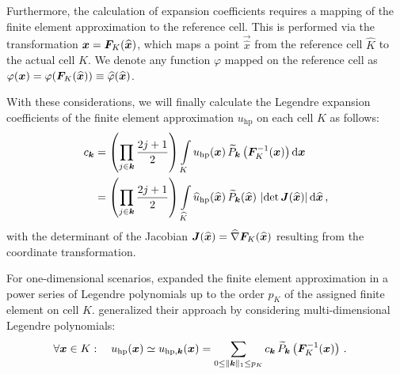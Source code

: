 Furthermore, the calculation of expansion coefficients requires a mapping of the finite element approximation to the reference cell. This is performed via the transformation $\vec{x} = \mat{F}_K(\vec{\widehat{x}})$, which maps a point $\vec{\widehat{x}}$ from the reference cell $\widehat{K}$ to the actual cell $K$. We denote any function $\varphi$ mapped on the reference cell as $\varphi(\vec{x}) = \varphi(\mat{F}_K(\vec{\widehat{x}})) \equiv \widehat{\varphi}(\vec{\widehat{x}})$. \textcite{dealiimapping}

With these considerations, we will finally calculate the Legendre expansion coefficients of the finite element approximation $u_\text{hp}$ on each cell $K$ as follows:
\begin{align}
c_\tuple{k} &=
\left(\prod\limits_{j \in \tuple{k}} \frac{2j+1}{2}\right) \int\limits_{K} u_\text{hp}(\vec{x}) \, \widetilde{P}_\tuple{k}\left(\mat{F}_K^{-1}(\vec{x})\right) \differential{\vec{x}} \\
&= \left(\prod\limits_{j \in \tuple{k}} \frac{2j+1}{2}\right) \int\limits_{\widehat{K}} \widehat{u}_\text{hp}(\vec{\widehat{x}}) \, \widetilde{P}_\tuple{k}(\vec{\widehat{x}}) \, \left|\det \mat{J}(\vec{\widehat{x}})\right| \differential{\vec{\widehat{x}}} \,\text{,}
\end{align}
with the determinant of the Jacobian $\mat{J}(\vec{\widehat{x}}) = \widehat{\nabla} \mat{F}_K (\vec{\widehat{x}})$ resulting from the coordinate transformation. \textcite{dealiilegendre}

For one-dimensional scenarios, \textcite{mavriplis1994} expanded the finite element approximation in a power series of Legendre polynomials up to the order $p_K$ of the assigned finite element on cell $K$. \textcites{houston2005}{eibner2007} generalized their approach by considering multi-dimensional Legendre polynomials:
\begin{align}
\forall \vec{x} \in K : \quad u_\text{hp} (\vec{x}) \simeq u_{\text{hp},\tuple{k}} (\vec{x}) &= \sum\limits_{0 \leq \|\tuple{k}\|_1 \leq p_K} c_\tuple{k} \, \widetilde{P}_\tuple{k}\left(\mat{F}_K^{-1}(\vec{x})\right) \,\text{.}
\end{align}


